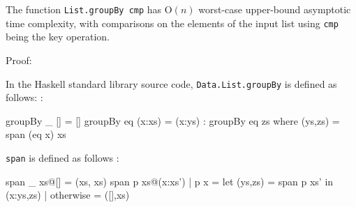 \documentclass[../main.tex]{subfiles}
\begin{document}



\begin{proposition}
	The function \texttt{List.groupBy cmp} has O$(n)$ worst-case upper-bound asymptotic time complexity, with comparisons on the elements of the input list using \texttt{cmp} being the key operation.
\end{proposition}

Proof:

In the Haskell standard library source code, \texttt{Data.List.groupBy} is defined as follows: \cite{hstdlib}:

\begin{code}
	groupBy _  []           =  []
	groupBy eq (x:xs)       =  (x:ys) : groupBy eq zs
	where (ys,zs) = span (eq x) xs
\end{code}

\texttt{span} is defined as follows \cite{hstdlib}:

\begin{code}
	span _ xs@[]            =  (xs, xs)
	span p xs@(x:xs')
	| p x          =  let (ys,zs) = span p xs' in (x:ys,zs)
	| otherwise    =  ([],xs)
\end{code}



\end{document}
